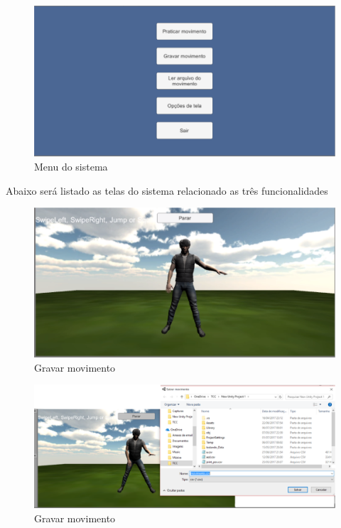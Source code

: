 \begin{figure}[H]
\centering
\includegraphics [keepaspectratio=true,scale=0.40]{figuras/menu.eps}
\caption{Menu do sistema}
\label{img:menu}
\end{figure}

  Abaixo será listado as telas do sistema relacionado as três funcionalidades

  \begin{figure}[H]
  \centering
  \includegraphics [keepaspectratio=true,scale=0.40]{figuras/gravarmovimento.eps}
  \caption{Gravar movimento}
  \label{img:gravarmovimento}
  \end{figure}

  \begin{figure}[H]
  \centering
  \includegraphics [keepaspectratio=true,scale=0.40]{figuras/gravarmovimento2.eps}
  \caption{Gravar movimento}
  \label{img2:gravarmovimento}
  \end{figure}

